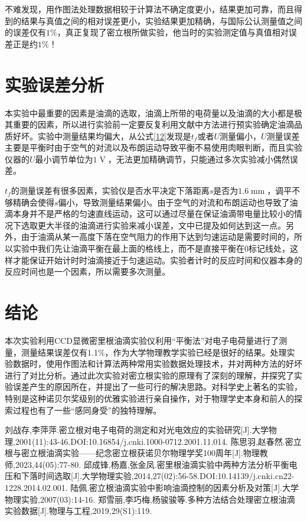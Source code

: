 \documentclass{WHUReport}
\begin{document}
\begin{multicols}{2}
	不难发现，用作图法处理数据相较于计算法不确定度更小，结果更加可靠，而且得到的结果与真值之间的相对误差更小，实验结果更加精确，与国际公认测量值之间的误差仅有$1\%$，真正复现了密立根所做实验，他当时的实验测定值与真值相对误差正是约$1\%$！
	\section{实验误差分析}
	本实验中最重要的因素是油滴的选取，油滴上所带的电荷量以及油滴的大小都是极其重要的因素，所以进行实验前一定要反复利用文献\cite{ref4}中方法进行预实验确定油滴品质好坏。实验中测量结果均偏大，从公式\ref{12}发现是$t_f$或者$U$测量偏小，$U$测量误差主要是平衡时由于空气的对流以及布朗运动导致平衡不易使用肉眼判断，而且实验仪器的$U$最小调节单位为$1\operatorname{V}$，无法更加精确调节，只能通过多次实验减小偶然误差。
	
	$t_f$的测量误差有很多因素，实验仪是否水平决定下落距离$s$是否为$1.6\operatorname{mm}$，调平不够精确会使得$s$偏小，导致测量结果偏小。由于空气的对流和布朗运动也导致了油滴本身并不是严格的匀速直线运动，这可以通过尽量在保证油滴带电量比较小的情况下选取更大半径的油滴进行实验来减小误差，文中已提及如何达到这一点。另外，由于油滴从某一高度下落在空气阻力的作用下达到匀速运动是需要时间的，所以实验中我们先让油滴平衡在最上面的格线上，而不是直接平衡在$0$标记线处，这样才能保证开始计时时油滴接近于匀速运动。实验者计时的反应时间和仪器本身的反应时间也是一个因素，所以需要多次测量。
	\section{结\quad 论}
	本次实验利用CCD显微密里根油滴实验仪利用“平衡法”对电子电荷量进行了测量，测量结果误差仅有1.1\%，作为大学物理教学实验已经是很好的结果。处理实验数据时，使用作图法和计算法两种常用实验数据处理技术，并对两种方法的好坏进行了对比分析。通过此次实验对密立根实验的原理有了深刻的理解，并探究了实验误差产生的原因所在，并提出了一些可行的解决思路。对科学史上著名的实验，特别是这种诺贝尔奖级别的优雅实验进行亲自操作，对于物理学史本身和前人的探索过程也有了一些“感同身受”的独特理解。
	
	\begin{thebibliography}{99}  
		刘战存,李萍萍.密立根对电子电荷的测定和对光电效应的实验研究[J].大学物理,2001(11):43-46.DOI:10.16854/j.cnki.1000-0712.2001.11.014.
		陈思羽,赵春然.密立根与密立根油滴实验——纪念密立根获诺贝尔物理学奖100周年[J].物理教师,2023,44(05):77-80.
		邱成锋,杨嘉,张金凤.密里根油滴实验中两种方法分析平衡电压和下落时间选取[J].大学物理实验,2014,27(02):56-58.DOI:10.14139/j.cnki.cn22-1228.2014.02.001.
		陆佩.密立根油滴实验中影响油滴控制的因素分析及对策[J].大学物理实验,2007(03):14-16.
		郑雪丽,李巧梅,杨骏骏等.多种方法结合处理密立根油滴实验数据[J].物理与工程,2019,29(S1):119.
	\end{thebibliography}
\end{multicols}
\end{document}
